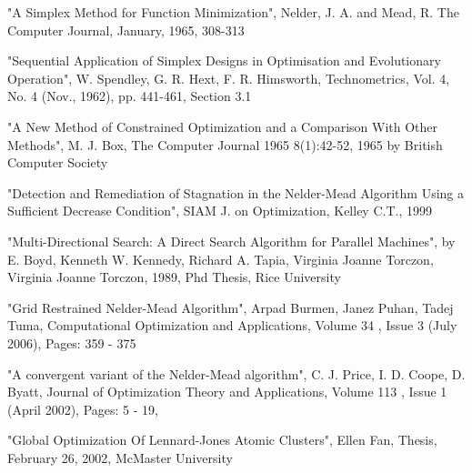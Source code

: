 \begin{References}\relax
"A Simplex Method for Function Minimization", Nelder, J. A. and Mead, R. The
Computer Journal, January, 1965, 308-313

"Sequential Application of Simplex Designs in Optimisation and Evolutionary
Operation", W. Spendley, G. R. Hext, F. R. Himsworth, Technometrics, Vol. 4, No.
4 (Nov., 1962), pp. 441-461, Section 3.1

"A New Method of Constrained Optimization and a Comparison With Other Methods",
M. J. Box, The Computer Journal 1965 8(1):42-52, 1965 by British Computer
Society

"Detection and Remediation of Stagnation in the Nelder-Mead Algorithm Using a
Sufficient Decrease Condition", SIAM J. on Optimization, Kelley C.T., 1999

"Multi-Directional Search: A Direct Search Algorithm for Parallel Machines", by
E. Boyd, Kenneth W. Kennedy, Richard A. Tapia, Virginia Joanne Torczon,
Virginia Joanne Torczon, 1989, Phd Thesis, Rice University

"Grid Restrained Nelder-Mead Algorithm", Arpad Burmen, Janez Puhan, Tadej Tuma,
Computational Optimization and Applications, Volume 34 , Issue 3 (July 2006),
Pages: 359 - 375

"A convergent variant of the Nelder-Mead algorithm", C. J. Price, I. D. Coope,
D. Byatt, Journal of Optimization Theory and Applications, Volume 113 , Issue 1
(April 2002), Pages: 5 - 19,

"Global Optimization Of Lennard-Jones Atomic Clusters", Ellen Fan, Thesis,
February 26, 2002, McMaster University
\end{References}
%
\begin{Examples}
\end{Examples}
